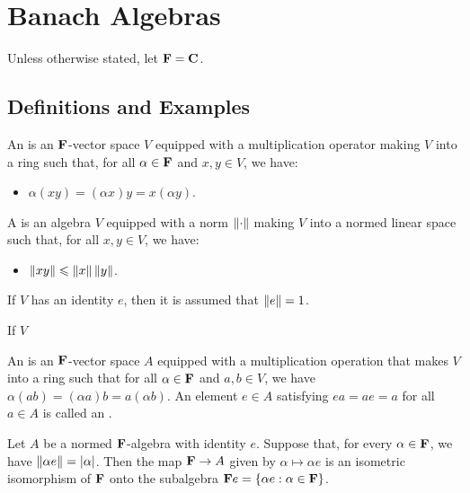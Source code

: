 \chapter{Banach Algebras}

Unless otherwise stated, let $\mathbf{F} = \mathbf{C}$.

\section{Definitions and Examples}

\begin{definition}
	An  is an $\mathbf{F}$-vector space $V$ equipped with a multiplication operator making $V$ into a ring such that, for all $\alpha \in \mathbf{F}$ and $x,y \in V$, we have:
	\mbox{}
	\begin{itemize}[itemsep=1pt,topsep=3pt]
		\item $\alpha (xy) = (\alpha x) y = x (\alpha y)$.
	\end{itemize}
\end{definition}

\begin{definition}
	A  is an algebra $V$ equipped with a norm $\left\lVert \cdot \right\rVert$ making $V$ into a normed linear space such that, for all $x,y \in V$, we have:
	\mbox{}
	\begin{itemize}[itemsep=1pt,topsep=3pt]
		\item $\left\lVert xy \right\rVert \leqslant \left\lVert x \right\rVert \left\lVert y \right\rVert$.
	\end{itemize}
	If $V$ has an identity $e$, then it is assumed that $\left\lVert e \right\rVert = 1$.
\end{definition}

\begin{proposition}
	If $V$  
\end{proposition}






\begin{definition}
	An  is an $\mathbf{F}$-vector space $A$ equipped with a multiplication operation that makes $V$ into a ring such that for all $\alpha \in \mathbf{F}$ and $a,b \in V$, we have $\alpha(ab) = (\alpha a)b = a(\alpha b)$. An element $e \in A$ satisfying $ea = ae = a$ for all $a \in A$ is called an . 
\end{definition}

\begin{proposition}
	Let $A$ be a normed $\mathbf{F}$-algebra with identity $e$. Suppose that, for every $\alpha \in \mathbf{F}$, we have $\left\lVert \alpha e \right\rVert = |\alpha|$. Then the map $\mathbf{F} \rightarrow A$ given by $\alpha \mapsto \alpha e$ is an isometric isomorphism of $\mathbf{F}$ onto the subalgebra $\mathbf{F} e = \{\alpha e : \alpha \in \mathbf{F}\}$.
\end{proposition}

